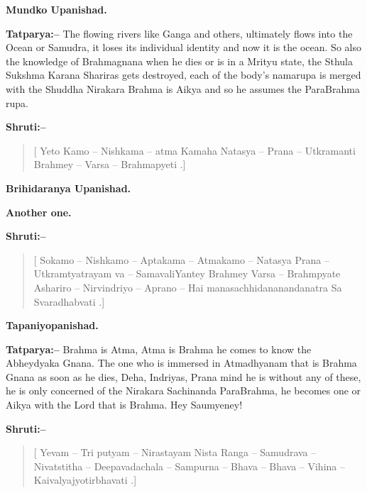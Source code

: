 \begin{flushright}
\textbf{Mundko Upanishad.}
\end{flushright}

\textbf{Tatparya:–} The flowing rivers like Ganga and others, ultimately flows into the Ocean or Samudra, it loses its individual identity and now it is the ocean. So also the knowledge of Brahmagnana when he dies or is in a Mrityu state, the Sthula Sukshma Karana Shariras gets destroyed, each of the body's namarupa is merged with the Shuddha Nirakara Brahma is Aikya and so he assumes the ParaBrahma rupa.

\textbf{Shruti:–}

\begin{verse}
[ Yeto Kamo – Nishkama – atma Kamaha Natasya – Prana – Utkramanti Brahmey – Varsa – Brahmapyeti .]
\end{verse}

\begin{flushright}
\textbf{Brihidaranya Upanishad.}
\end{flushright}

\begin{center}
\textbf{Another one.}
\end{center}

\textbf{Shruti:–}

\begin{verse}
[ Sokamo – Nishkamo – Aptakama – Atmakamo – Natasya Prana – Utkramtyatrayam va – SamavaliYantey  Brahmey Varsa – Brahmpyate  Ashariro – Nirvindriyo – Aprano – Hai manasachhidananandanatra Sa Svaradhabvati .]
\end{verse}

\begin{flushright}
\textbf{Tapaniyopanishad.}
\end{flushright}

\textbf{Tatparya:–} Brahma is Atma, Atma is Brahma he comes to know the Abheydyaka Gnana. The one who is immersed in Atmadhyanam that is Brahma Gnana as soon as he dies, Deha, Indriyas, Prana mind he is without any of these, he is only concerned of the Nirakara Sachinanda ParaBrahma, he becomes one or Aikya with the Lord that is Brahma. Hey Saumyeney!

\textbf{Shruti:–}

\begin{verse}
[ Yevam – Tri putyam – Nirastayam Nista Ranga – Samudrava – Nivatstitha – Deepavadachala – Sampurna – Bhava – Bhava – Vihina – Kaivalyajyotirbhavati .]
\end{verse}

